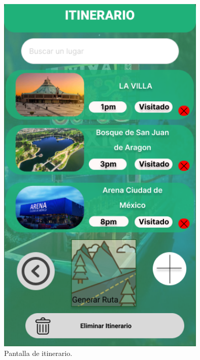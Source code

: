 \begin{figure}[htb]
    \centering
    \includegraphics[width=10cm]{pantalla10.png}
    \caption{Pantalla de itinerario.}
    \label{fig:enter-label}
\end{figure}

